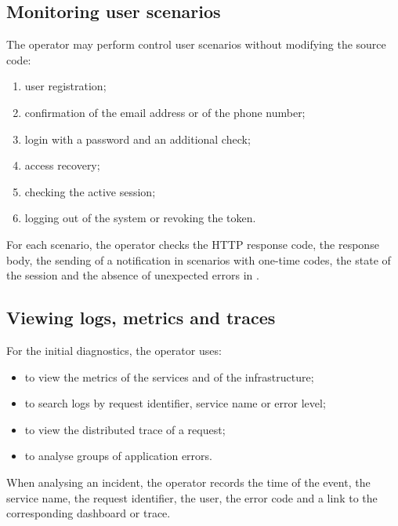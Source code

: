 \documentclass[12pt,a4paper]{extarticle}
\begin{document}
\subsection{Monitoring user scenarios}

\begin{hseExample}
The operator may perform control user scenarios without modifying the source code:

\begin{enumerate}[label=\arabic*), leftmargin=1.25cm]
    \item user registration;
    \item confirmation of the email address or of the phone number;
    \item login with a password and an additional check;
    \item access recovery;
    \item checking the active session;
    \item logging out of the system or revoking the token.
\end{enumerate}

For each scenario, the operator checks the HTTP response code, the response body, the sending of a notification in scenarios with one-time codes, the state of the session and the absence of unexpected errors in .
\end{hseExample}

\subsection{Viewing logs, metrics and traces}

\begin{hseExample}
For the initial diagnostics, the operator uses:

\begin{itemize}[leftmargin=1.25cm]
    \item {} to view the metrics of the services and of the infrastructure;
    \item {} to search logs by request identifier, service name or error level;
    \item {} to view the distributed trace of a request;
    \item {} to analyse groups of application errors.
\end{itemize}

When analysing an incident, the operator records the time of the event, the service name, the request identifier, the user, the error code and a link to the corresponding dashboard or trace.
\end{hseExample}
\end{document}
